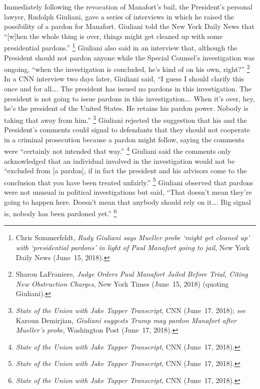 Immediately following the revocation of Manafort's bail, the President's personal lawyer, Rudolph Giuliani, gave a series of interviews in which he raised the possibility of a pardon for Manafort.
Giuliani told the New York Daily News that ``[w]hen the whole thing is over, things might get cleaned up with some presidential pardons.''%
\footnote{Chris Sommerfeldt, \textit{Rudy Giuliani says Mueller probe `might get cleaned up' with `presidential pardons' in light of Paul Manafort going to jail}, New York Daily News (June~15, 2018).}
Giuliani also said in an interview that, although the President should not pardon anyone while the Special Counsel's investigation was ongoing, ``when the investigation is concluded, he's kind of on his own, right?''%
\footnote{Sharon LaFraniere, \textit{Judge Orders Paul Manafort Jailed Before Trial, Citing New Obstruction Charges}, New York Times (June~15, 2018) (quoting Giuliani).}
In a CNN interview two days later, Giuliani said, ``I guess I should clarify this once and for all\dots.
The president has issued no pardons in this investigation.
The president is not going to issue pardons in this investigation\dots. When it's over, hey, he's the president of the United States.
He retains his pardon power.
Nobody is taking that away from him.''%
\footnote{\textit{State of the Union with Jake Tapper Transcript}, CNN (June~17, 2018);
\textit{see} Karoun Demirjian, \textit{Giuliani suggests Trump may pardon Manafort after Mueller's probe}, Washington Post (June~17, 2018).}
Giuliani rejected the suggestion that his and the President's comments could signal to defendants that they should not cooperate in a criminal prosecution because a pardon might follow, saying the comments were ``certainly not intended that way.''%
\footnote{\textit{State of the Union with Jake Tapper Transcript}, CNN (June~17, 2018).}
Giuliani said the comments only acknowledged that an individual involved in the investigation would not be ``excluded from [a pardon], if in fact the president and his advisors come to the conclusion that you have been treated unfairly.''%
\footnote{\textit{State of the Union with Jake Tapper Transcript}, CNN (June~17, 2018).}
Giuliani observed that pardons were not unusual in political investigations but said, ``That doesn't mean they're going to happen here.
Doesn't mean that anybody should rely on it\dots.
Big signal is, nobody has been pardoned yet.''%
\footnote{\textit{State of the Union with Jake Tapper Transcript}, CNN (June~17, 2018).}

